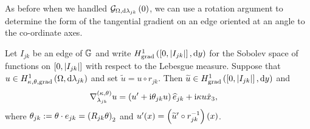 As before when we handled $\mathcal{G}_{ \Omega, \mathrm{d}\lambda_{jk}}\left( 0 \right)$, we can use a rotation argument to determine the form of the tangential gradient on an edge oriented at an angle to the co-ordinate axes.
\begin{cory} \label{cory:3DTangGradRotated}
	Let $I_{jk}$ be an edge of $\mathbb{G}$ and write $H^1_\mathrm{grad}\left( \left[ 0,\left\lvert I_{jk} \right\rvert \right], \mathrm{d}y \right)$ for the Sobolev space of functions on $\left[ 0,\left\lvert I_{jk} \right\rvert \right]$ with respect to the Lebesgue measure.
	Suppose that $u\in H^1_{\kappa,\theta,\mathrm{grad}}\left( \Omega, \mathrm{d}\lambda_{jk} \right)$ and set $\widetilde{u} = u \circ r_{jk}$.
	Then $\widetilde{u}\in H^1_\mathrm{grad}\left( \left[ 0,\left\lvert I_{jk} \right\rvert \right], \mathrm{d}y \right)$ and
	\begin{align*}
		\nabla^{\left( \kappa, \theta \right)}_{\lambda_{jk}} u &= \left( u'+\mathrm{i}\theta_{jk} u \right)\widehat{e}_{jk} + \mathrm{i}\kappa u \hat{x}_3,
	\end{align*}
	where $\theta_{jk} := \theta\cdot e_{jk} = \left( R_{jk}\theta \right)_2$ and $u'(x) = \left( \widetilde{u}'\circ r_{jk}^{-1} \right)(x)$.
\end{cory}
